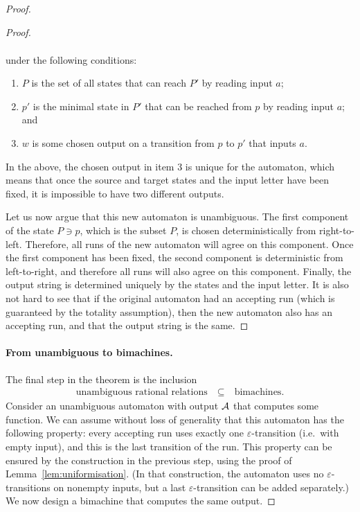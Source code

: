 \begin{proof}
\begin{proof}
\begin{itemize}
\begin{align*}
        \end{align*}
        under the following conditions:
        \begin{enumerate}
            \item $P$ is the set of all states that can reach $P'$ by reading input $a$;
            \item $p'$ is the minimal state in $P'$ that can be reached from $p$ by reading input $a$; and
            \item $w$ is some chosen output on a transition from $p$ to $p'$ that inputs $a$.
        \end{enumerate}
        In the above, the chosen output in item 3 is unique for the automaton, which means that once the source and target states and the input letter have been fixed, it is impossible to have two different outputs.
        \end{itemize}
    Let us now argue that this new automaton is unambiguous. The first component of the state $P \ni p$, which is the subset $P$, is chosen deterministically from right-to-left. Therefore, all runs of the new automaton will agree on this component. Once the first component has been fixed, the second component is deterministic from left-to-right, and therefore all runs will also agree on this component. Finally, the output string is determined uniquely by the states and the input letter. It is also not hard to see that if the original automaton had an accepting run (which is guaranteed by the totality assumption), then the new automaton also has an accepting run, and that the output string is the same.
\end{proof}

\paragraph*{From unambiguous to bimachines.}
The final step in the theorem is the inclusion
\begin{align*}
\text{unambiguous rational relations} \quad \subseteq \quad \text{bimachines.}
\end{align*}
Consider an unambiguous automaton with output ${\mathcal A}$ that computes some function. We can assume without loss of generality that this automaton has the following property: every accepting run uses exactly one $\varepsilon$-transition (i.e.~with empty input), and this is the last transition of the run. This property can be ensured by the construction in the previous step, using the proof of Lemma~\ref{lem:uniformisation}. (In that construction, the automaton uses no $\varepsilon$-transitions on nonempty inputs, but a last $\varepsilon$-transition can be added separately.)
We now design a bimachine that computes the same output.


\end{proof}
